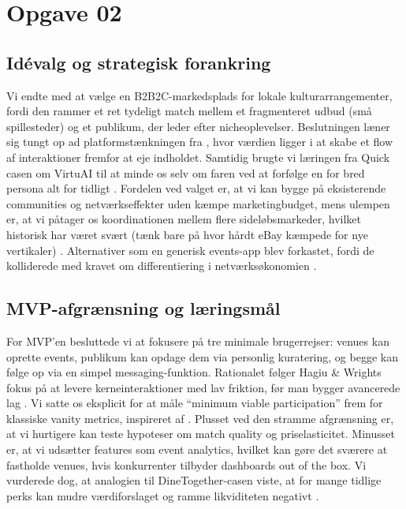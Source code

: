 \section*{Opgave 02}

\subsection*{Idévalg og strategisk forankring}
Vi endte med at vælge en B2B2C-markedsplads for lokale kulturarrangementer, fordi den rammer et ret tydeligt match mellem et fragmenteret udbud (små spillesteder) og et publikum, der leder efter nicheoplevelser. Beslutningen læner sig tungt op ad platformstænkningen fra \citet{Choudary2016,Reillier2017}, hvor værdien ligger i at skabe et flow af interaktioner fremfor at eje indholdet. Samtidig brugte vi læringen fra Quick casen om VirtuAI til at minde os selv om faren ved at forfølge en for bred persona alt for tidligt \citep{Gunasilan2024}. Fordelen ved valget er, at vi kan bygge på eksisterende communities og netværkseffekter uden kæmpe marketingbudget, mens ulempen er, at vi påtager os koordinationen mellem flere sideløbsmarkeder, hvilket historisk har været svært (tænk bare på hvor hårdt eBay kæmpede for nye vertikaler) \citep{HagiuWright2013}. Alternativer som en generisk events-app blev forkastet, fordi de kolliderede med kravet om differentiering i netværksøkonomien \citep{ShapiroVarian1999}.

\subsection*{MVP-afgrænsning og læringsmål}
For MVP'en besluttede vi at fokusere på tre minimale brugerrejser: venues kan oprette events, publikum kan opdage dem via personlig kuratering, og begge kan følge op via en simpel messaging-funktion. Rationalet følger Hagiu \& Wrights fokus på at levere kerneinteraktioner med lav friktion, før man bygger avancerede lag \citep{HagiuWright2013}. Vi satte os eksplicit for at måle “minimum viable participation” frem for klassiske vanity metrics, inspireret af \citet{Reillier2017}. Plusset ved den stramme afgrænsning er, at vi hurtigere kan teste hypoteser om match quality og priselasticitet. Minusset er, at vi udsætter features som event analytics, hvilket kan gøre det sværere at fastholde venues, hvis konkurrenter tilbyder dashboards out of the box. Vi vurderede dog, at analogien til DineTogether-casen viste, at for mange tidlige perks kan mudre værdiforslaget og ramme likviditeten negativt \citep{Rennella2023}.

